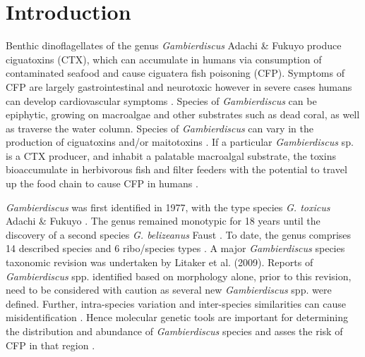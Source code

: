 \documentclass[12pt]{article}
\begin{document}
\newpage
\section*{Introduction}
Benthic dinoflagellates of the genus \emph{Gambierdiscus} Adachi \& Fukuyo produce ciguatoxins (CTX), which can accumulate in humans via consumption of contaminated seafood and cause ciguatera fish poisoning (CFP). Symptoms of CFP are largely gastrointestinal and neurotoxic however in severe cases humans can develop cardiovascular symptoms \citep{sims1987theoretical}. Species of \emph{Gambierdiscus} can be epiphytic, growing on macroalgae and other substrates such as dead coral, as well as traverse the water column. Species of \textit{Gambierdiscus} can vary in the production of ciguatoxins and/or maitotoxins \citep{chinain2010ciguatera,kohli2014high}. If a particular \emph{Gambierdiscus} sp. is a CTX producer, and inhabit a palatable macroalgal substrate, the toxins bioaccumulate in herbivorous fish and filter feeders with the potential to travel up the food chain to cause CFP in humans  \citep{chinain1997intraspecific,holmes1998gambierdiscus}. %

\emph{Gambierdiscus} was first identified in 1977, with the type species \emph{G. toxicus} Adachi \& Fukuyo \citep{adachi1979thecal}. The genus remained monotypic for 18 years until the discovery of a second species \emph{G. belizeanus} Faust \citep{faust1995observation}. To date, the genus comprises 14 described species and 6 ribo/species types
 \citep{smith2016new,fraga2016gambierdiscus,litaker2010global,adachi1979thecal,faust1995observation,chinain1999morphology,litaker2009taxonomy,dai2017taxonomic,nishimura2014morphology,rhodes2017new,kretzschmar2016characterization,fraga2011gambierdiscus,xu2014distribution,fraga2014genus} .
A major \emph{Gambierdiscus} species taxonomic revision was undertaken by Litaker et al. (2009). Reports of \emph{Gambierdiscus} spp. identified based on morphology alone, prior to this revision, need to be considered with caution as several new \emph{Gambierdiscus} spp. were defined. Further, intra-species variation and inter-species similarities can cause misidentification \citep{bravo2014cellular,kretzschmar2016characterization,kohli2014high}. Hence molecular genetic tools are important for determining the distribution and abundance of  \textit{Gambierdiscus} species and asses the risk of CFP in that region \citep{kohli2014high,kretzschmar2016characterization}. \\
\end{document}

